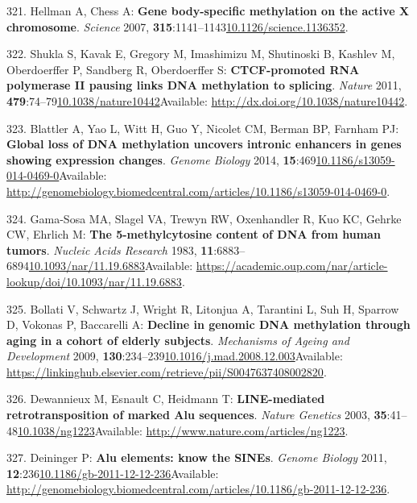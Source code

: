\documentclass[
]{book}
\begin{document}
\leavevmode\hypertarget{ref-Hellman2007}{}%
321. Hellman A, Chess A: \textbf{Gene body-specific methylation on the active X chromosome}. \emph{Science} 2007, \textbf{315}:1141--1143\href{https://doi.org/10.1126/science.1136352}{10.1126/science.1136352}.

\leavevmode\hypertarget{ref-Shukla2011}{}%
322. Shukla S, Kavak E, Gregory M, Imashimizu M, Shutinoski B, Kashlev M, Oberdoerffer P, Sandberg R, Oberdoerffer S: \textbf{CTCF-promoted RNA polymerase II pausing links DNA methylation to splicing}. \emph{Nature} 2011, \textbf{479}:74--79\href{https://doi.org/10.1038/nature10442}{10.1038/nature10442}Available: \url{http://dx.doi.org/10.1038/nature10442}.

\leavevmode\hypertarget{ref-Blattler2014}{}%
323. Blattler A, Yao L, Witt H, Guo Y, Nicolet CM, Berman BP, Farnham PJ: \textbf{Global loss of DNA methylation uncovers intronic enhancers in genes showing expression changes}. \emph{Genome Biology} 2014, \textbf{15}:469\href{https://doi.org/10.1186/s13059-014-0469-0}{10.1186/s13059-014-0469-0}Available: \url{http://genomebiology.biomedcentral.com/articles/10.1186/s13059-014-0469-0}.

\leavevmode\hypertarget{ref-Gama-Sosa1983}{}%
324. Gama-Sosa MA, Slagel VA, Trewyn RW, Oxenhandler R, Kuo KC, Gehrke CW, Ehrlich M: \textbf{The 5-methylcytosine content of DNA from human tumors}. \emph{Nucleic Acids Research} 1983, \textbf{11}:6883--6894\href{https://doi.org/10.1093/nar/11.19.6883}{10.1093/nar/11.19.6883}Available: \url{https://academic.oup.com/nar/article-lookup/doi/10.1093/nar/11.19.6883}.

\leavevmode\hypertarget{ref-Bollati2010}{}%
325. Bollati V, Schwartz J, Wright R, Litonjua A, Tarantini L, Suh H, Sparrow D, Vokonas P, Baccarelli A: \textbf{Decline in genomic DNA methylation through aging in a cohort of elderly subjects}. \emph{Mechanisms of Ageing and Development} 2009, \textbf{130}:234--239\href{https://doi.org/10.1016/j.mad.2008.12.003}{10.1016/j.mad.2008.12.003}Available: \url{https://linkinghub.elsevier.com/retrieve/pii/S0047637408002820}.

\leavevmode\hypertarget{ref-Dewannieux2003}{}%
326. Dewannieux M, Esnault C, Heidmann T: \textbf{LINE-mediated retrotransposition of marked Alu sequences}. \emph{Nature Genetics} 2003, \textbf{35}:41--48\href{https://doi.org/10.1038/ng1223}{10.1038/ng1223}Available: \url{http://www.nature.com/articles/ng1223}.

\leavevmode\hypertarget{ref-Deininger2011}{}%
327. Deininger P: \textbf{Alu elements: know the SINEs}. \emph{Genome Biology} 2011, \textbf{12}:236\href{https://doi.org/10.1186/gb-2011-12-12-236}{10.1186/gb-2011-12-12-236}Available: \url{http://genomebiology.biomedcentral.com/articles/10.1186/gb-2011-12-12-236}.
\end{document}
